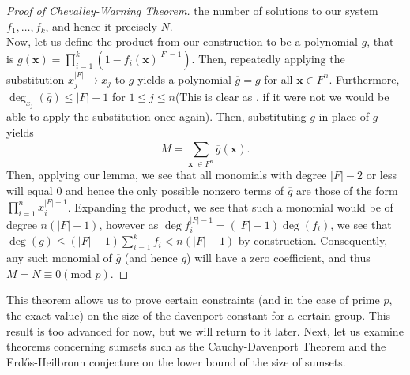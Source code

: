 \begin{proof}[Proof of
Chevalley-Warning Theorem]
the number of solutions to our system $f_1, \ldots, f_{k}$, and hence it
precisely $N$.\\ Now, let us define the product from our construction to be a
polynomial  $g$, that is $g\left( \textbf{x} \right) = \prod_{i= 1}^{k} \left(
	1-f_{i}\left( \textbf{x} \right) ^{\left| F \right| -1} \right)$. Then,
	repeatedly applying the substitution $ x_{j}^{\left| F \right| } \to
	x_{j}$ to $g$ yields a polynomial $\overline{g} = g$ for all
	$\textbf{x}\in F^{n}$. Furthermore, $ \deg _{ x_j} \left(  \overline{g}
	\right) \le \left| F \right| -1$ for $1 \le j \le n$(This is clear as ,
	if it were not we would be able to apply the substitution once again).
	Then, substituting $\overline{g}$ in place of $g$ yields \[ M =
	\sum_{\textbf{x } \in F^{n}}^{} \overline{g}\left( \textbf{x} \right)
.\] Then, applying our lemma, we see that all monomials with degree $\left| F
\right|  -2$ or less will equal $0$ and hence the only possible nonzero terms
of $\overline{g}$ are those of the form $ \prod_{i= 1}^{n}  x_{i}^{\left| F
\right| -1}$. Expanding the product, we see that such a monomial would be of
degree $n\left(\left| F \right| - 1 \right)$, however as $\deg f_{i} ^{\left| F
\right| -1} = \left( \left| F \right| -1 \right) \deg \left( f_{i} \right)$, we
see that $\deg \left( g \right) \le \left( \left| F \right| -1 \right) \sum_{i=
1}^{k} f_{i} < n\left( \left| F \right| -1 \right)$ by construction.
Consequently, any such monomial of $\overline{g}$ (and hence $g$) will have a
zero coefficient, and thus $M = N \equiv 0 \left( \text{mod } p \right) $.
\end{proof} This theorem allows us to prove certain constraints (and in the
case of prime  $p$, the exact value) on the size of the davenport constant for
a certain group. This result is too advanced for now, but we will return to it
later. Next, let us examine theorems concerning sumsets such as the
Cauchy-Davenport Theorem and the Erdős-Heilbronn conjecture on the lower bound
of the size of sumsets.
